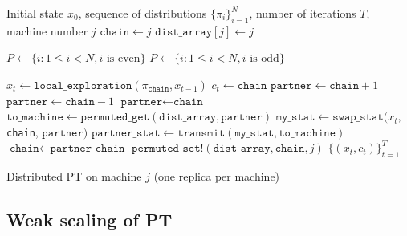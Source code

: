 \begin{algorithm}[t]
	\begin{algorithmic}[1]
    \Require Initial state $x_0$, sequence of distributions $\{\pi_i\}_{i=1}^N$, 
      number of iterations $T$, machine number $j$
    \State $\texttt{chain} \gets j$ 
    \State $\texttt{dist\_array}[j] \gets j$ 
		
		   
		    \State $P \gets \{i: 1 \le i < N, i \text{ is even} \}$
		  \Else
		    \State $P \gets \{i: 1 \le i < N, i \text{ is odd} \}$
		  \EndIf

      \State $x_t \gets \texttt{local\_exploration}(\pi_\texttt{chain}, x_{t-1})$
      \State $c_t \gets \texttt{chain}$ 
        \State $\texttt{partner} \gets \texttt{chain}+1$
        \State $\texttt{partner} \gets \texttt{chain}-1$
      \Else 
      	\State $\texttt{partner} \gets \texttt{chain}$
      \EndIf
      \State $\texttt{to\_machine} \gets  \texttt{permuted\_get}(\texttt{dist\_array}, \texttt{partner})$
      \State $\texttt{my\_stat} \gets \texttt{swap\_stat}(x_t, $\texttt{chain}, $\texttt{partner} )$  
      \State $\texttt{partner\_stat} \gets \texttt{transmit}(\texttt{my\_stat}, \texttt{to\_machine})$
        \State $\texttt{chain} \gets \texttt{partner\_chain}$
      \EndIf
      \State $\texttt{permuted\_set!}(\texttt{dist\_array}, \texttt{chain}, j)$ 
		\EndFor
    \State \Return $\{(x_t, c_t)\}_{t=1}^T$
	\end{algorithmic}
  \caption{Distributed PT on machine $j$ (one replica per machine)}
  \label{alg:distributed_PT}
\end{algorithm}


\subsection{Weak scaling of PT}

